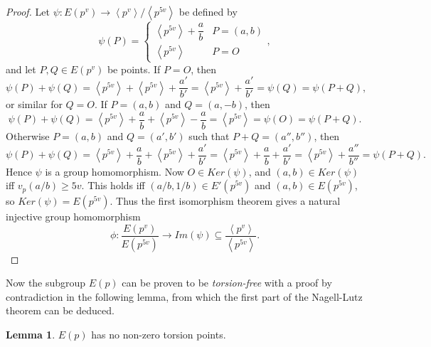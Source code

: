 \documentclass{article}
\newcommand{\rb}[1]{\left( #1 \right)}
\newcommand{\ab}[1]{\left\langle #1 \right\rangle}
\theoremstyle{definition}\newtheorem*{definition}{Definition}
\theoremstyle{definition}\newtheorem*{example}{Example}
\theoremstyle{definition}\newtheorem*{remark}{Remark}
\newtheorem{lemma}[proposition]{Lemma}
\begin{document}
\begin{proof}
Let $ \psi : E\rb{p^v} \to \ab{p^v} / \ab{p^{5v}} $ be defined by
$$ \psi\rb{P} = \begin{cases} \ab{p^{5v}} + \dfrac{a}{b} & P = \rb{a, b} \\ \ab{p^{5v}} & P = O \end{cases}, $$
and let $ P, Q \in E\rb{p^v} $ be points. If $ P = O $, then
$$ \psi\rb{P} + \psi\rb{Q} = \ab{p^{5v}} + \ab{p^{5v}} + \dfrac{a'}{b'} = \ab{p^{5v}} + \dfrac{a'}{b'} = \psi\rb{Q} = \psi\rb{P + Q}, $$
or similar for $ Q = O $. If $ P = \rb{a, b} $ and $ Q = \rb{a, -b} $, then
$$ \psi\rb{P} + \psi\rb{Q} = \ab{p^{5v}} + \dfrac{a}{b} + \ab{p^{5v}} - \dfrac{a}{b} = \ab{p^{5v}} = \psi\rb{O} = \psi\rb{P + Q}. $$
Otherwise $ P = \rb{a, b} $ and $ Q = \rb{a', b'} $ such that $ P + Q = \rb{a'', b''} $, then
$$ \psi\rb{P} + \psi\rb{Q} = \ab{p^{5v}} + \dfrac{a}{b} + \ab{p^{5v}} + \dfrac{a'}{b'} = \ab{p^{5v}} + \dfrac{a}{b} + \dfrac{a'}{b'} = \ab{p^{5v}} + \dfrac{a''}{b''} = \psi\rb{P + Q}. $$
Hence $ \psi $ is a group homomorphism. Now $ O \in Ker\rb{\psi} $, and $ \rb{a, b} \in Ker\rb{\psi} $ iff $ v_p\rb{a / b} \ge 5v $. This holds iff $ \rb{a / b, 1 / b} \in E'\rb{p^{5v}} $ and $ \rb{a, b} \in E\rb{p^{5v}} $, so $ Ker\rb{\psi} = E\rb{p^{5v}} $. Thus the first isomorphism theorem gives a natural injective group homomorphism
$$ \phi : \dfrac{E\rb{p^v}}{E\rb{p^{5v}}} \to Im\rb{\psi} \subseteq \dfrac{\ab{p^v}}{\ab{p^{5v}}}. $$
\end{proof}

Now the subgroup $ E\rb{p} $ can be proven to be \emph{torsion-free} with a proof by contradiction in the following lemma, from which the first part of the Nagell-Lutz theorem can be deduced.

\begin{lemma}
$ E\rb{p} $ has no non-zero torsion points.
\end{lemma}
\end{document}
